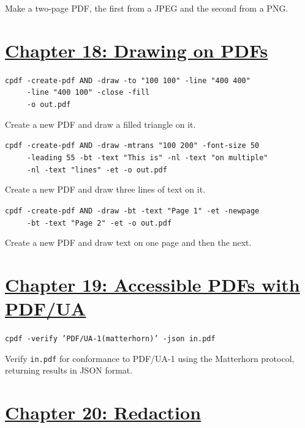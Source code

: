 \documentclass{book}
\begin{document}
\noindent Make a two-page PDF, the first from a JPEG and the second from a PNG.

\section*{\hyperref[chap:18]{Chapter 18: Drawing on PDFs}}

\begin{framed}
 \noindent\small\verb?cpdf -create-pdf AND -draw -to "100 100" -line "400 400"?\\
 \noindent\small\verb?     -line "400 100" -close -fill?\\
 \noindent\small\verb?     -o out.pdf?
\end{framed}

\noindent Create a new PDF and draw a filled triangle on it.

\begin{framed}
 \noindent\small\verb?cpdf -create-pdf AND -draw -mtrans "100 200" -font-size 50?\\
 \noindent\small\verb?     -leading 55 -bt -text "This is" -nl -text "on multiple"?\\
 \noindent\small\verb?     -nl -text "lines" -et -o out.pdf?
\end{framed}

\noindent Create a new PDF and draw three lines of text on it.

\begin{framed}
 \noindent\small\verb!cpdf -create-pdf AND -draw -bt -text "Page 1" -et -newpage!\\
 \noindent\small\verb!     -bt -text "Page 2" -et -o out.pdf!
\end{framed}

\noindent Create a new PDF and draw text on one page and then the next.

\section*{\hyperref[chap:misc]{Chapter 19: Accessible PDFs with PDF/UA}}

\begin{framed}\noindent\texttt{cpdf -verify 'PDF/UA-1(matterhorn)' -json in.pdf}\end{framed}

\noindent Verify \texttt{in.pdf} for conformance to PDF/UA-1 using the Matterhorn protocol, returning results in JSON format.

\section*{\hyperref[chap:misc]{Chapter 20: Redaction}}
\end{document}

